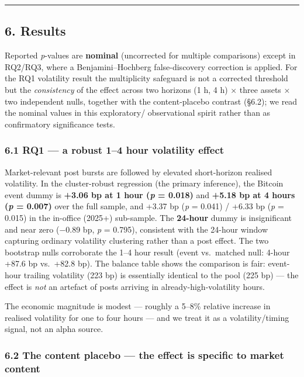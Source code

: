 \documentclass[
]{article}
\begin{document}
\begin{center}\rule{0.5\linewidth}{0.5pt}\end{center}

\subsection{6. Results}\label{results}

Reported \emph{p}-values are \textbf{nominal} (uncorrected for multiple
comparisons) except in RQ2/RQ3, where a Benjamini--Hochberg
false-discovery correction is applied. For the RQ1 volatility result the
multiplicity safeguard is not a corrected threshold but the
\emph{consistency} of the effect across two horizons (1 h, 4 h) × three
assets × two independent nulls, together with the content-placebo
contrast (§6.2); we read the nominal values in this exploratory/
observational spirit rather than as confirmatory significance tests.

\subsubsection{6.1 RQ1 --- a robust 1--4 hour volatility
effect}\label{rq1-a-robust-14-hour-volatility-effect}

Market-relevant post bursts are followed by elevated short-horizon
realised volatility. In the cluster-robust regression (the primary
inference), the Bitcoin event dummy is \textbf{+3.06 bp at 1 hour
(\emph{p} = 0.018)} and \textbf{+5.18 bp at 4 hours (\emph{p} = 0.007)}
over the full sample, and +3.37 bp (\emph{p} = 0.041) / +6.33 bp
(\emph{p} = 0.015) in the in-office (2025+) sub-sample. The
\textbf{24-hour} dummy is insignificant and near zero (−0.89 bp,
\emph{p} = 0.795), consistent with the 24-hour window capturing ordinary
volatility clustering rather than a post effect. The two bootstrap nulls
corroborate the 1--4 hour result (event vs.~matched null: 4-hour +87.6
bp vs.~+82.8 bp). The balance table shows the comparison is fair:
event-hour trailing volatility (223 bp) is essentially identical to the
pool (225 bp) --- the effect is \emph{not} an artefact of posts arriving
in already-high-volatility hours.

The economic magnitude is modest --- roughly a 5--8\% relative increase
in realised volatility for one to four hours --- and we treat it as a
volatility/timing signal, not an alpha source.

\subsubsection{6.2 The content placebo --- the effect is specific to
market
content}\label{the-content-placebo-the-effect-is-specific-to-market-content}
\end{document}
